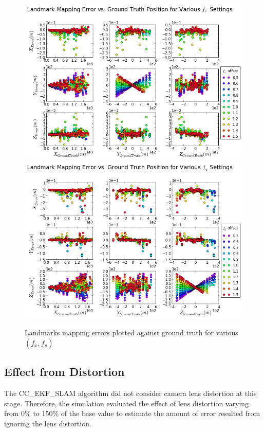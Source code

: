 \begin{figure}[h]
  \centering
  \includegraphics[width=13cm,keepaspectratio=true]{./Figures/SimulationFigures/Figure41.png}
  \includegraphics[width=13cm,keepaspectratio=true]{./Figures/SimulationFigures/Figure42.png}
  \caption{Landmarks mapping errors plotted against ground truth
    for various $(f_x, f_y)$}
  \label{fig:simfig38-39}
\end{figure}
\FloatBarrier

\subsection{Effect from Distortion}
The CC\_EKF\_SLAM algorithm did not consider camera lens distortion
at this stage. Therefore, the simulation evaluated the effect of
lens distortion varying from 0\% to 150\% of the base value to
estimate the amount of error resulted from ignoring the lens distortion.

